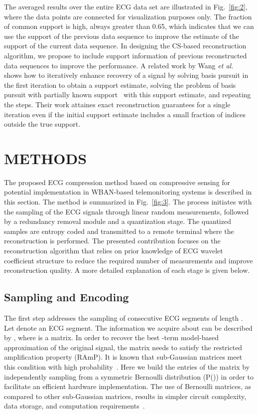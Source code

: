 \documentclass[journal]{IEEEtran}
\begin{document}
The averaged results over the entire ECG data set are illustrated in Fig.~\ref{fig:2}, where the data points are connected for visualization purposes only. The fraction of common support is high, always greater than 0.65, which indicates that we can use the support of the previous data sequence to improve the estimate of the support of the current data sequence. In designing the CS-based reconstruction algorithm, we propose to include support information of previous reconstructed data sequences to improve the performance. A related work by Wang \textit{et al.}~\cite{Wang10} shows how to iteratively enhance recovery of a signal by solving basis pursuit in the first iteration to obtain a support estimate, solving the problem of basis pursuit with partially known support~\cite{Vasw09} with this support estimate, and repeating the steps. Their work attaines exact reconstruction guarantees for a single iteration even if the initial support estimate includes a small fraction of indices outside the true support.

\section{METHODS}
\label{ssec:CSPKSSS}
The proposed ECG compression method based on compressive sensing for potential implementation in WBAN-based telemonitoring systems is described in this section. The method is summarized in Fig.~\ref{fig:3}. The process initiates with the sampling of the ECG signals through linear random measurements, followed by a redundancy removal module and a quantization stage. The quantized samples are entropy coded and transmitted to a remote terminal where the reconstruction is performed. The presented contribution focuses on the reconstruction algorithm that relies on prior knowledge of ECG wavelet coefficient structure to reduce the required number of measurements and improve reconstruction quality. A more detailed explanation of each stage is given below.

\subsection{Sampling and Encoding}
The first step addresses the sampling of consecutive ECG segments of length . Let  denote an ECG segment. The information we acquire about  can be described by , where  is a  matrix. In order to recover the best -term model-based approximation of the original signal, the matrix  needs to satisfy the restricted amplification property (RAmP). It is known that sub-Gaussian matrices meet this condition with high probability~\cite{Bara10}. Here we build the entries of the matrix  by independently sampling from a symmetric Bernoulli distribution (P()) in order to facilitate an efficient hardware implementation. The use of Bernoulli matrices, as compared to other sub-Gaussian matrices, results in simpler circuit complexity, data storage, and computation requirements~\cite{Chen12}.
\end{document}
